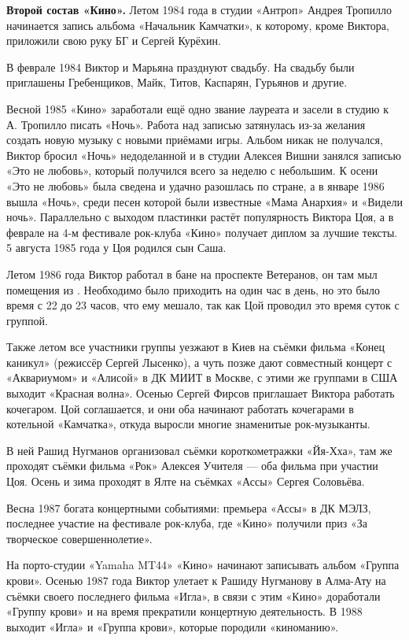 \textbf{Второй состав «Кино».}
Летом 1984 года в студии «Антроп» Андрея Тропилло начинается запись альбома «Начальник Камчатки», к которому, кроме Виктора, приложили свою руку БГ и Сергей Курёхин.

В феврале 1984 Виктор и Марьяна празднуют свадьбу. На свадьбу были приглашены Гребенщиков, Майк, Титов, Каспарян, Гурьянов и другие.

Весной 1985 «Кино» заработали ещё одно звание лауреата и засели в студию к А. Тропилло писать «Ночь». Работа над записью затянулась из-за желания создать новую музыку с новыми приёмами игры. Альбом никак не получался, Виктор бросил «Ночь» недоделанной и в студии Алексея Вишни занялся записью «Это не любовь», который получился всего за неделю с небольшим. К осени «Это не любовь» была сведена и удачно разошлась по стране, а в январе 1986 вышла «Ночь», среди песен которой были известные «Мама Анархия» и «Видели ночь». Параллельно с выходом пластинки растёт популярность Виктора Цоя, а в феврале на 4-м фестивале рок-клуба «Кино» получает диплом за лучшие тексты. 5 августа 1985 года у Цоя родился сын Саша.


Летом 1986 года Виктор работал в бане на проспекте Ветеранов, он там мыл помещения из . Необходимо было приходить на один час в день, но это было время с 22 до 23 часов, что ему мешало, так как Цой проводил это время суток с группой.

Также летом все участники группы уезжают в Киев на съёмки фильма «Конец каникул» (режиссёр Сергей Лысенко), а чуть позже дают совместный концерт с «Аквариумом» и «Алисой» в ДК МИИТ в Москве, с этими же группами в США выходит «Красная волна». Осенью Сергей Фирсов приглашает Виктора работать кочегаром. Цой соглашается, и они оба начинают работать кочегарами в котельной «Камчатка», откуда выросли многие знаменитые рок-музыканты.

В ней Рашид Нугманов организовал съёмки короткометражки «Йя-Хха», там же проходят съёмки фильма «Рок» Алексея Учителя --- оба фильма при участии Цоя. Осень и зима проходят в Ялте на съёмках «Ассы» Сергея Соловьёва.

Весна 1987 богата концертными событиями: премьера «Ассы» в ДК МЭЛЗ, последнее участие на фестивале рок-клуба, где «Кино» получили приз «За творческое совершеннолетие».

На порто-студии «Yamaha MT44» «Кино» начинают записывать альбом «Группа крови». Осенью 1987 года Виктор улетает к Рашиду Нугманову в Алма-Ату на съёмки своего последнего фильма «Игла», в связи с этим «Кино» доработали «Группу крови» и на время прекратили концертную деятельность. В 1988 выходит «Игла» и «Группа крови», которые породили «киноманию».

